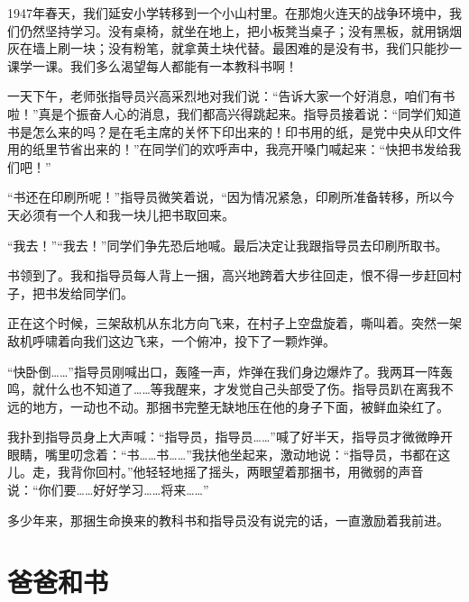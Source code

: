 \documentclass[12pt,UTF-8,openany]{ctexbook}
\begin{document}
\begin{Large}
    
    1947年春天，我们延安小学转移到一个小山村里。在那炮火连天的战争环境中，我们仍然坚持学习。没有桌椅，就坐在地上，把小板凳当桌子；没有黑板，就用锅烟灰在墙上刷一块；没有粉笔，就拿黄土块代替。最困难的是没有书，我们只能抄一课学一课。我们多么渴望每人都能有一本教科书啊！
    
    一天下午，老师张指导员兴高采烈地对我们说：“告诉大家一个好消息，咱们有书啦！”真是个振奋人心的消息，我们都高兴得跳起来。指导员接着说：“同学们知道书是怎么来的吗？是在毛主席的关怀下印出来的！印书用的纸，是党中央从印文件用的纸里节省出来的！”在同学们的欢呼声中，我亮开嗓门喊起来：“快把书发给我们吧！”
    
    “书还在印刷所呢！”指导员微笑着说，“因为情况紧急，印刷所准备转移，所以今天必须有一个人和我一块儿把书取回来。
    
    “我去！”“我去！”同学们争先恐后地喊。最后决定让我跟指导员去印刷所取书。
    
    书领到了。我和指导员每人背上一捆，高兴地跨着大步往回走，恨不得一步赶回村子，把书发给同学们。
    
    正在这个时候，三架敌机从东北方向飞来，在村子上空盘旋着，嘶叫着。突然一架敌机呼啸着向我们这边飞来，一个俯冲，投下了一颗炸弹。
    
    “快卧倒……”指导员刚喊出口，轰隆一声，炸弹在我们身边爆炸了。我两耳一阵轰鸣，就什么也不知道了……等我醒来，才发觉自己头部受了伤。指导员趴在离我不远的地方，一动也不动。那捆书完整无缺地压在他的身子下面，被鲜血染红了。
    
    我扑到指导员身上大声喊：“指导员，指导员……”喊了好半天，指导员才微微睁开眼睛，嘴里叨念着：“书……书……”我扶他坐起来，激动地说：“指导员，书都在这儿。走，我背你回村。”他轻轻地摇了摇头，两眼望着那捆书，用微弱的声音说：“你们要……好好学习……将来……”
    
    多少年来，那捆生命换来的教科书和指导员没有说完的话，一直激励着我前进。
    
\end{Large}

\chapter{爸爸和书}
\end{document}
